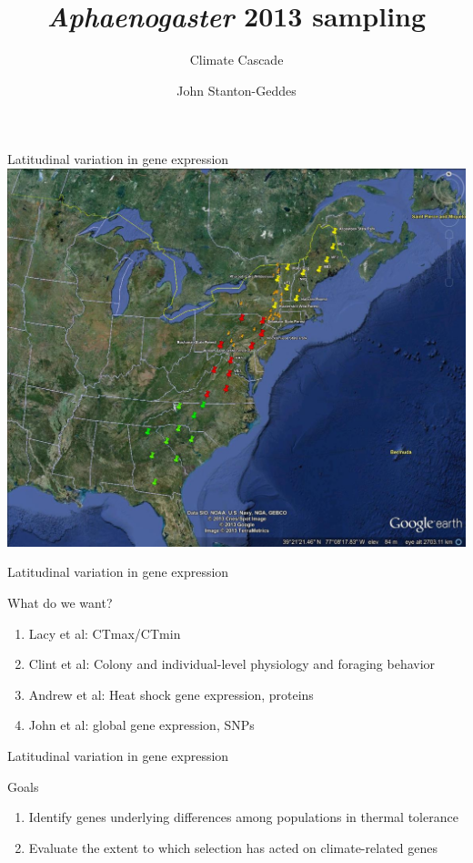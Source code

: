 \documentclass{beamer}
\title[]{\textit{Aphaenogaster} 2013 sampling}
\subtitle{Climate Cascade}
\author{John Stanton-Geddes}
\institute{Department of Biology \\ University of Vermont}
\begin{document}
\begin{frame}
  \titlepage
\end{frame}


\begin{frame}{Latitudinal variation in gene expression}
	\includegraphics[width=\textwidth, height=\textheight, keepaspectratio]{Aphaenogaster2013_sampling_locations_20130313.jpg}
\end{frame}


\begin{frame}{Latitudinal variation in gene expression}
	\begin{block}{What do we want?}
		\begin{enumerate}
			\item Lacy et al: CTmax/CTmin
			\item Clint et al: Colony and individual-level physiology and foraging behavior
			\item Andrew et al: Heat shock gene expression, proteins
			\item John et al: global gene expression, SNPs
		\end{enumerate}
	\end{block}
\end{frame}


\begin{frame}{Latitudinal variation in gene expression}
	\begin{block}{Goals}
		\begin{enumerate}
			\item Identify genes underlying differences among populations in thermal tolerance
			\item Evaluate the extent to which selection has acted on climate-related genes
		\end{enumerate}
	\end{block}
\end{frame}
\end{document}
